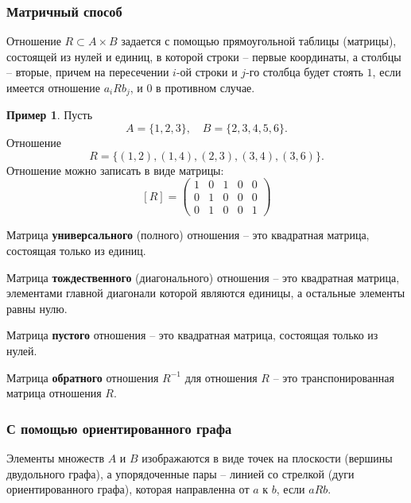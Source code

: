 \documentclass[a5paper, 11pt]{extarticle}
\theoremstyle{definition}
\newtheorem*{example*}{Пример}
\theoremstyle{definition}
\theoremstyle{definition}
\numberwithin{figure}{section}
\numberwithin{table}{section}
\begin{document}
\subsubsection{Матричный способ}

Отношение \(R \subset A \times B\) задается с помощью прямоугольной таблицы (матрицы), состоящей из нулей и единиц, в которой строки -- первые координаты, а столбцы -- вторые, причем на пересечении \(i\)-ой строки и \(j\)-го столбца будет стоять \(1\), если имеется отношение \(a_i R b_j\), и \(0\) в противном случае.

\begin{example*}
    Пусть
    \[
        A = \{1, 2, 3\},
        \quad
        B = \{2, 3, 4, 5, 6\}.
    \]
    Отношение
    \[
        R = \{(1, 2), (1, 4), (2, 3), (3, 4), (3, 6)\}.
    \]
    Отношение можно записать в виде матрицы:
    \[
        [R] =
        \begin{pmatrix}
            1 & 0 & 1 & 0 & 0 \\
            0 & 1 & 0 & 0 & 0 \\
            0 & 1 & 0 & 0 & 1
        \end{pmatrix}
    \]
\end{example*}

Матрица \textbf{универсального} (полного) отношения -- это квадратная матрица, состоящая только из единиц.

Матрица \textbf{тождественного} (диагонального) отношения -- это квадратная матрица, элементами главной диагонали которой являются единицы, а остальные элементы равны нулю.

Матрица \textbf{пустого} отношения -- это квадратная матрица, состоящая только из нулей.

Матрица \textbf{обратного} отношения \(R^{-1}\) для отношения \(R\) -- это транспонированная матрица отношения \(R\).

\subsubsection{С помощью ориентированного графа}

Элементы множеств \(A\) и \(B\) изображаются в виде точек на плоскости (вершины двудольного графа), а упорядоченные пары --  линией со стрелкой (дуги ориентированного графа), которая направленна от \(a\) к \(b\), если \(aRb\).
\end{document}
